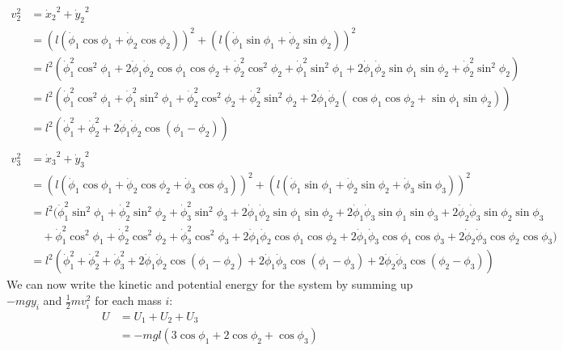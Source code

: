 \documentclass{article}
\begin{document}
\begin{appendices}
\begin{align}
        v_2^2 &= {\dot x_2}^2+{\dot y_2}^2 \\
        &= (l(\dot\phi_1\cos\phi_1+\dot\phi_2\cos\phi_2))^2
          +(l(\dot\phi_1\sin\phi_1+\dot\phi_2\sin\phi_2))^2 \\
        &= l^2\left( \dot\phi_1^2\cos^2\phi_1 
            + 2\dot\phi_1\dot\phi_2\cos\phi_1\cos\phi_2 
            + \dot\phi_2^2\cos^2\phi_2 + \dot\phi_1^2\sin^2\phi_1 
            + 2\dot\phi_1\dot\phi_2\sin\phi_1\sin\phi_2 
            + \dot\phi_2^2\sin^2\phi_2 \right) \\
        &= l^2\left( \dot\phi_1^2\cos^2\phi_1 + \dot\phi_1^2\sin^2\phi_1
            + \dot\phi_2^2\cos^2\phi_2 + \dot\phi_2^2\sin^2\phi_2
            + 2\dot\phi_1\dot\phi_2(\cos\phi_1\cos\phi_2 + \sin\phi_1\sin\phi_2)
             \right) \\
        &= l^2\left( \dot\phi_1^2 + \dot\phi_2^2
            + 2\dot\phi_1\dot\phi_2\cos(\phi_1 - \phi_2) \right) \\\\
        v_3^2 &= {\dot x_3}^2+{\dot y_3}^2 \\
        &= (l(\dot\phi_1\cos\phi_1+\dot\phi_2\cos\phi_2+\dot\phi_3\cos\phi_3))^2 
          +(l(\dot\phi_1\sin\phi_1+\dot\phi_2\sin\phi_2+\dot\phi_3\sin\phi_3))^2 \\
        &= l^2\bigl( \dot\phi_1^2\sin^2\phi_1+\dot\phi_2^2\sin^2\phi_2
           +\dot\phi_3^2\sin^2\phi_3 + 2\dot\phi_1\dot\phi_2\sin\phi_1\sin\phi_2
           +2\dot\phi_1\dot\phi_3\sin\phi_1\sin\phi_3
           +2\dot\phi_2\dot\phi_3\sin\phi_2\sin\phi_3 \\
           &\quad +\dot\phi_1^2\cos^2\phi_1+\dot\phi_2^2\cos^2\phi_2
           +\dot\phi_3^2\cos^2\phi_3 + 2\dot\phi_1\dot\phi_2\cos\phi_1\cos\phi_2
           +2\dot\phi_1\dot\phi_3\cos\phi_1\cos\phi_3
           +2\dot\phi_2\dot\phi_3\cos\phi_2\cos\phi_3
        \bigr) \\
        &= l^2\left( \dot\phi_1^2+\dot\phi_2^2 +\dot\phi_3^2 
           +2\dot\phi_1\dot\phi_2\cos(\phi_1-\phi_2)
           +2\dot\phi_1\dot\phi_3\cos(\phi_1-\phi_3)
           +2\dot\phi_2\dot\phi_3\cos(\phi_2-\phi_3) \right) 
    \end{align}
    We can now write the kinetic and potential energy for the system by summing
    up $-mgy_i$ and $\frac{1}{2}mv_i^2$ for each mass $i$:
    \begin{align}
        U &= U_1 + U_2 + U_3 \\
        &= -mgl\left(3\cos\phi_1+2\cos\phi_2+\cos\phi_3 \right) \\\\

\end{align}
\end{appendices}
\end{document}

